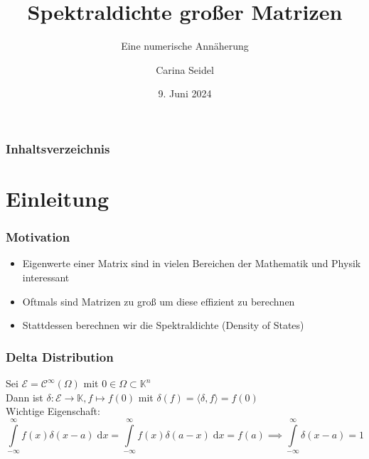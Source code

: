 \documentclass{beamer}
\title{Spektraldichte großer Matrizen}
\subtitle{Eine numerische Annäherung}
\author{Carina Seidel}
\institute[Universität Potsdam]{Universität Potsdam}
\date[9. Juni 2024]{9. Juni 2024}
\newcommand{\dx}{\;\mathrm{d}x}
\newcommand{\Cinfty}{\mathcal{C}^{\infty}}
\newcommand{\C}{\mathbb{C}}
\newcommand{\K}{\mathbb{K}}
\newcommand{\R}{\mathbb{R}}
\begin{document}
\begin{frame}
\titlepage
\end{frame}
\begin{frame}
\frametitle{Inhaltsverzeichnis}
\tableofcontents
\end{frame}

\section{Einleitung}

\begin{frame}
    \frametitle{Motivation}
    \begin{itemize}
        \item Eigenwerte einer Matrix sind in vielen Bereichen der Mathematik und Physik interessant
        \item Oftmals sind Matrizen zu groß um diese effizient zu berechnen
        \item Stattdessen berechnen wir die Spektraldichte (Density of States)
    \end{itemize}
\end{frame}

\begin{frame}
    \frametitle{Delta Distribution}
    Sei $\mathcal{E} = \Cinfty(\Omega)$ mit $0 \in \Omega \subset \K^n$\\
    Dann ist $\delta: \mathcal{E} \to \K, f \mapsto f(0)$ mit $\delta(f) = \langle \delta, f \rangle = f(0)$\\
    Wichtige Eigenschaft:
    $$\int\limits_{-\infty}^{\infty} f(x) \delta(x-a) \dx = \int\limits_{-\infty}^{\infty} f(x) \delta(a-x) \dx = f(a) \implies \int\limits_{-\infty}^{\infty} \delta(x-a) = 1$$
\end{frame}

\end{document}
